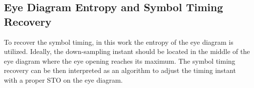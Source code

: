 \documentclass[12pt, draftclsnofoot, onecolumn]{IEEEtran}
\begin{document}
\subsection{Eye Diagram Entropy and Symbol Timing Recovery}
\label{sec:eye_entp}
To recover the symbol timing, in this work the entropy of the eye diagram is utilized. 
Ideally, the down-sampling instant should be located in the middle of the eye diagram where the eye opening reaches its maximum.
The symbol timing recovery can be then interpreted as an algorithm to adjust the timing instant with a proper STO on the eye diagram.
\end{document}
